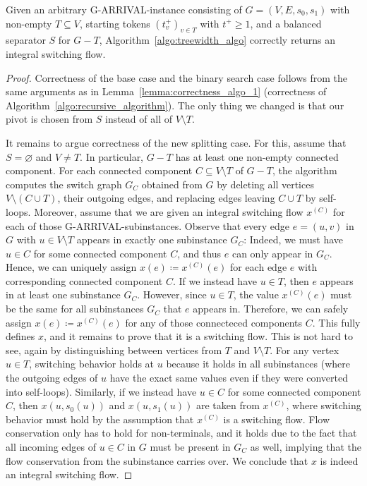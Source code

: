 \documentclass[a4paper,UKenglish,cleveref, autoref, thm-restate]{lipics-v2021}
\let\emptyset\varnothing
\newcommand{\problem}[1]{\textrm{#1}}
\newcommand{\garrival}{\problem{G-ARRIVAL}}
\begin{document}
\begin{lemma}
\label{lemma:correctness_algo_2}
    Given an arbitrary \garrival-instance consisting of $G = (V, E, s_0, s_1)$ with non-empty $T \subseteq V$, starting tokens $(t^+_v)_{v \in T}$ with $t^+ \geq 1$, and a balanced separator $S$ for $G - T$, Algorithm~\ref{algo:treewidth_algo} correctly returns an integral switching flow.
\end{lemma}
\begin{proof}
    Correctness of the base case and the binary search case follows from the same arguments as in Lemma~\ref{lemma:correctness_algo_1} (correctness of Algorithm~\ref{algo:recursive_algorithm}). The only thing we changed is that our pivot is chosen from $S$ instead of all of $V \setminus T$.
    
    It remains to argue correctness of the new splitting case. For this, assume that $S = \emptyset$ and $V \neq T$. In particular, $G - T$ has at least one non-empty connected component. For each connected component $C \subseteq V \setminus T$ of $G - T$, the algorithm computes the switch graph $G_C$ obtained from $G$ by deleting all vertices $V \setminus (C \cup T)$, their outgoing edges, and replacing edges leaving $C \cup T$ by self-loops. Moreover, assume that we are given an integral switching flow $x^{(C)}$ for each of those \garrival-subinstances. Observe that every edge $e = (u, v)$ in $G$ with $u \in V \setminus T$ appears in exactly one subinstance $G_C$: Indeed, we must have $u \in C$ for some connected component $C$, and thus $e$ can only appear in $G_C$. Hence, we can uniquely assign $x(e) \coloneqq x^{(C)}(e)$ for each edge $e$ with corresponding connected component $C$. If we instead have $u \in T$, then $e$ appears in at least one subinstance $G_C$. However, since $u \in T$, the value $x^{(C)}(e)$ must be the same for all subinstances $G_C$ that $e$ appears in. Therefore, we can safely assign $x(e) \coloneqq x^{(C)}(e)$ for any of those connecteced components $C$. This fully defines $x$, and it remains to prove that it is a switching flow. This is not hard to see, again by distinguishing between vertices from $T$ and $V \setminus T$. For any vertex $u \in T$, switching behavior holds at $u$ because it holds in all subinstances (where the outgoing edges of $u$ have the exact same values even if they were converted into self-loops). Similarly, if we instead have $u \in C$ for some connected component $C$, then $x(u, s_0(u))$ and $x(u, s_1(u))$ are taken from $x^{(C)}$, where switching behavior must hold by the assumption that $x^{(C)}$ is a switching flow. Flow conservation only has to hold for non-terminals, and it holds due to the fact that all incoming edges of $u \in C$ in $G$ must be present in $G_C$ as well, implying that the flow conservation from the subinstance carries over. We conclude that $x$ is indeed an integral switching flow.
\end{proof}
\end{document}
